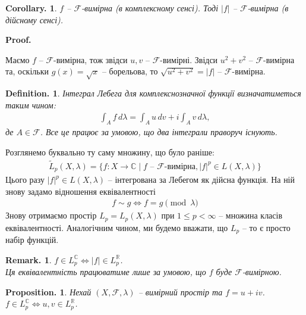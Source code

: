 \documentclass[a4paper, 10pt]{article}
\makeatletter
\theoremstyle{theoremdd}
\newtheorem*{definition*}{Definition.}
\newtheorem*{proposition*}{Proposition.}
\newtheorem*{remark*}{Remark.}
\newtheorem*{corollary*}{Corollary.}
\renewenvironment{proof}[1][Proof.\\]{\par
\pushQED{\hfill \qed}%
\normalfont \topsep6\p@\@plus6\p@\relax
\trivlist
\item\relax
{\bfseries
#1\@addpunct{.}}\hspace\labelsep\ignorespaces
}{%
\popQED\endtrivlist\@endpefalse
}
\makeatother
\begin{document}
\begin{corollary*}
$f$ -- $\mathcal{F}$-вимірна (в комплексному сенсі). Тоді $|f|$ -- $\mathcal{F}$-вимірна (в дійсному сенсі).
\end{corollary*}

\begin{proof}
Маємо $f$ -- $\mathcal{F}$-вимірна, тож звідси $u,v$ -- $\mathcal{F}$-вимірні. Звідси $u^2 + v^2$ -- $\mathcal{F}$-вимірна та, оскільки $g(x) = \sqrt{x}$ -- борельова, то $\sqrt{u^2 + v^2} = |f|$ -- $\mathcal{F}$-вимірна.
\end{proof}

\begin{definition*}
Інтеграл Лебега для комплекснозначної функції визначатиметься таким чином:
\begin{align*}
\int_A f\,d\lambda = \int_A u\,dv + i \int_A v\,d\lambda,
\end{align*}
де $A \in \mathcal{F}$. Все це працює за умовою, що два інтеграли праворуч існують.
\end{definition*}

\noindent Розглянемо буквально ту саму множину, що було раніше:
\begin{align*}
\tilde{L}_p(X,\lambda) = \{f \colon X \to \mathbb{C} \mid f \text{ -- } \mathcal{F}\text{-вимірна}, |f|^p \in L(X,\lambda)\}
\end{align*}
Цього разу $|f|^p \in L(X,\lambda)$ -- інтегрована за Лебегом як дійсна функція. На ній знову задамо відношення еквівалентності
\begin{align*}
f \sim g \iff f = g \pmod \lambda
\end{align*}
Знову отримаємо простір $L_p = L_p(X,\lambda)$ при $1 \leq p < \infty$ -- множина класів еквівалентності. Аналогічним чином, ми будемо вважати, що $L_p$ -- то є просто набір функцій.

\begin{remark*}
$f \in L_p^{\mathbb{C}} \iff |f| \in L_p^{\mathbb{R}}$.\\
Ця еквівалентність працюватиме лише за умовою, що $f$ буде $\mathcal{F}$-вимірною.
\end{remark*}

\begin{proposition*}
Нехай $(X,\mathcal{F},\lambda)$ -- вимірний простір та $f = u + iv$.\\
$f \in L_p^{\mathbb{C}} \iff u,v \in L_p^{\mathbb{R}}$.
\end{proposition*}
\end{document}
